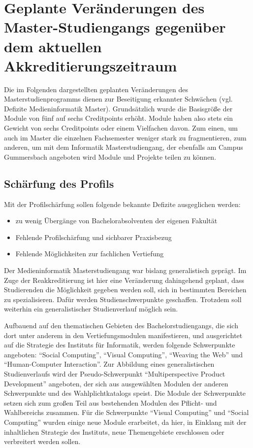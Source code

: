 \chapter{Geplante Veränderungen des Master-Studiengangs gegenüber dem
aktuellen
Akkreditierungszeitraum}\label{geplante-veruxe4nderungen-des-master-studiengangs-gegenuxfcber-dem-aktuellen-akkreditierungszeitraum}

Die im Folgenden dargestellten geplanten Veränderungen des
Masterstudienprogramms dienen zur Beseitigung erkannter Schwächen (vgl.
Defizite Medieninformatik Master). Grundsätzlich wurde die Basisgröße
der Module von fünf auf sechs Creditpoints erhöht. Module haben also
stets ein Gewicht von sechs Creditpoints oder einem Vielfachen davon.
Zum einen, um auch im Master die einzelnen Fachsemester weniger stark zu
fragmentieren, zum anderen, um mit dem Informatik Masterstudiengang, der
ebenfalls am Campus Gummersbach angeboten wird Module und Projekte
teilen zu können.

\section{Schärfung des Profils}\label{schuxe4rfung-des-profils}

Mit der Profilschärfung sollen folgende bekannte Defizite ausgeglichen
werden:

\begin{itemize}
\tightlist
\item
  zu wenig Übergänge von Bachelorabsolventen der eigenen Fakultät
\item
  Fehlende Profilschärfung und sichbarer Praxisbezug
\item
  Fehlende Möglichkeiten zur fachlichen Vertiefung
\end{itemize}

Der Medieninformatik Masterstudiengang war bislang generalistisch
geprägt. Im Zuge der Reakkreditierung ist hier eine Veränderung
dahingehend geplant, dass Studierenden die Möglichkeit gegeben werden
soll, sich in bestimmten Bereichen zu spezialisieren. Dafür werden
Studienschwerpunkte geschaffen. Trotzdem soll weiterhin ein
generalistischer Studienverlauf möglich sein.

Aufbauend auf den thematischen Gebieten des Bachelorstudiengangs, die
sich dort unter anderem in den Vertiefungsmodulen manifestieren, und
ausgerichtet auf die Strategie des Instituts für Informatik, werden
folgende Schwerpunkte angeboten: ``Social Computing'', ``Visual
Computing'', ``Weaving the Web'' und ``Human-Computer Interaction''. Zur
Abbildung eines generalistischen Studienverlaufs wird der
Pseudo-Schwerpunkt ``Multiperspective Product Development'' angeboten,
der sich aus ausgewählten Modulen der anderen Schwerpunkte und des
Wahlplichtkatalogs speist. Die Module der Schwerpunkte setzen sich zum
großen Teil aus bestehenden Modulen des Pflicht- und Wahlbereichs
zusammen. Für die Schwerpunkte ``Visual Computing'' und ``Social
Computing'' wurden einige neue Module erarbeitet, da hier, in Einklang
mit der inhaltlichen Strategie des Instituts, neue Themengebiete
erschlossen oder verbreitert werden sollen.

